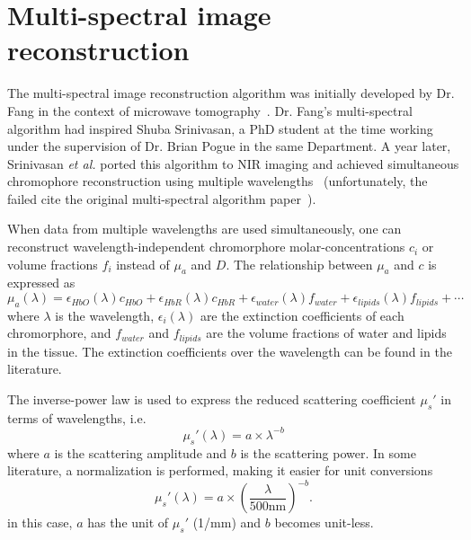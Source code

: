 \documentclass[12pt]{book}               %
\begin{document}
\section{Multi-spectral image reconstruction}
The multi-spectral image reconstruction algorithm was initially developed by Dr. Fang in the context of microwave tomography~\cite{Fang2004a, FangThesis}. Dr. Fang's multi-spectral algorithm had inspired Shuba Srinivasan, a PhD student at the time working under the supervision of Dr. Brian Pogue in the same Department. A year later, Srinivasan \emph{et al.} ported this algorithm to NIR imaging and achieved simultaneous chromophore reconstruction using multiple wavelengths~\cite{Srinivasan2025} (unfortunately, the failed cite the original multi-spectral algorithm paper~\cite{Fang2004a}).

When data from multiple wavelengths are used simultaneously, one can reconstruct wavelength-independent chromorphore molar-concentrations $c_i$ or volume fractions $f_i$ instead of $\mu_a$ and $D$. The relationship between $\mu_a$ and $c$ is expressed as
\begin{equation}
\mu_a(\lambda)=\epsilon_{HbO}(\lambda)c_{HbO}+\epsilon_{HbR}(\lambda)c_{HbR}+\epsilon_{water}(\lambda)f_{water}+\epsilon_{lipids}(\lambda)f_{lipids}+ \cdots
\end{equation}
where $\lambda$ is the wavelength, $\epsilon_i(\lambda)$ are the extinction coefficients of each chromorphore, and $f_{water}$ and $f_{lipids}$ are the volume fractions of water and lipids in the tissue. The extinction coefficients over the wavelength can be found in the literature. 

The inverse-power law is used to express the reduced scattering coefficient $\mu_s'$ in terms of wavelengths, i.e.
\begin{equation}
\mu_s'(\lambda)=a\times\lambda^{-b}
\end{equation}
where $a$ is the scattering amplitude and $b$ is the scattering power. In some literature, a normalization is performed, making it easier for unit conversions
\begin{equation}
\mu_s'(\lambda)=a\times\left(\frac{\lambda}{500 \mathrm{nm}}\right)^{-b}.
\end{equation}
in this case, $a$ has the unit of $\mu_s'$ (1/mm) and $b$ becomes unit-less.
\end{document}
